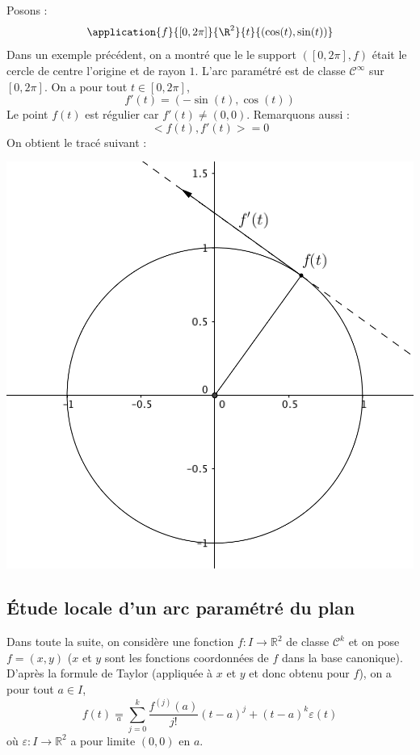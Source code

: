 \documentclass[french,11pt,twoside]{VcCours}
\begin{document}
\medskip

\begin{Exemple} Posons :
\[\application{f}{[0,2\pi]}{\R^2}{t}{(\cos(t), \sin(t))}\]
Dans un exemple précédent, on a montré que le le support $([0,2\pi],f)$ était le cercle de centre l'origine et de rayon $1$. L'arc paramétré est de classe $\mathcal{C}^{\infty}$ sur $[0,2\pi]$. On a pour tout $t \in [0, 2 \pi]$,
$$ f'(t) = (-\sin(t),\cos(t))$$
Le point $f(t)$ est régulier car $f'(t) \neq (0,0)$. Remarquons aussi :
$$ <f(t),f'(t)> = 0$$
On obtient le tracé suivant :

\begin{center}
\includegraphics[scale=0.4]{cercle}
\end{center}
\end{Exemple}


\subsection{Étude locale d'un arc paramétré du plan}
Dans toute la suite, on considère une fonction $f : I \rightarrow \mathbb{R}^2$ de classe $\mathcal{C}^k$ et on pose $f=(x,y)$ ($x$ et $y$ sont les fonctions coordonnées de $f$ dans la base canonique). D'après la formule de Taylor (appliquée à $x$ et $y$ et donc obtenu pour $f$), on a pour tout $a \in I$,
$$ f(t)  \underset{a}{=} \sum_{j=0}^k \dfrac{f^{(j)}(a)}{j!} (t-a)^j+ (t-a)^k \varepsilon(t)$$
où $\varepsilon : I \rightarrow \mathbb{R}^2$ a pour limite $(0,0)$ en $a$.
\end{document}

